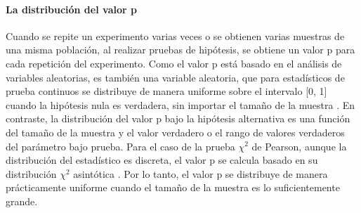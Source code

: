 \paragraph{La distribución del valor p}
  Cuando se repite un experimento varias veces o se obtienen varias muestras de una misma población, al realizar pruebas de hipótesis, se obtiene un valor p para cada repetición del experimento. Como el valor p está basado en el análisis de variables aleatorias, es también una variable aleatoria, que para estadísticos de prueba continuos se distribuye de manera uniforme sobre el intervalo [0, 1] cuando la hipótesis nula es verdadera, sin importar el tamaño de la muestra \cite{hung1997behavior}. En contraste, la distribución del valor p bajo la hipótesis alternativa es una función del tamaño de la muestra y el valor verdadero o el rango de valores verdaderos del parámetro bajo prueba. Para el caso de la prueba $\chi^{2}$ de Pearson, aunque la distribución del estadístico es discreta, el valor p se calcula basado en su distribución $\chi^{2}$ asintótica \cite{wang2019p}. Por lo tanto, el valor p se distribuye de manera prácticamente uniforme cuando el tamaño de la muestra es lo suficientemente grande.